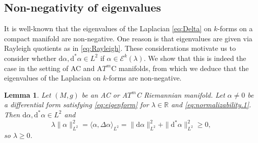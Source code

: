 \documentclass{article}
\newtheorem{lem}[thm]{Lemma}
\theoremstyle{definition}
\numberwithin{thm}{section}
\numberwithin{equation}{section}
\def\R{\mathbb{R}}
\def\d{\mathrm{d}}
\begin{document}
\subsection{Non-negativity of eigenvalues}

It is well-known that the eigenvalues  of the Laplacian \eqref{eq:Delta} on $k$-forms on a compact manifold are non-negative.  One reason is that eigenvalues are given via Rayleigh quotients as in \eqref{eq:Rayleigh}.  These considerations motivate us to  consider whether $\d\alpha,\d^*\alpha\in L^2$ if $\alpha\in\mathcal{E}^k(\lambda)$.   We show that this is indeed the case in the setting of AC and A$T^m$C manifolds, from which we deduce that the eigenvalues of the Laplacian on $k$-forms are non-negative.

\begin{lem}\label{lem:lambda.non.neg} Let $(M,g)$ be an AC or A$T^m$C Riemannian manifold. Let $\alpha\neq 0$ be a differential form satisfying \eqref{eq:eigenform} for $\lambda\in\R$ and \eqref{eq:normalizability.1}.  Then $\d\alpha,\d^*\alpha\in L^2$ and
\begin{equation}\label{eq:lambda.non.neg}
\lambda\|\alpha\|_{L^2}^2=\langle \alpha,\Delta\alpha\rangle_{L^2}=\|\d\alpha\|_{L^2}^2+\|\d^*\alpha\|_{L^2}^2\geq 0,
\end{equation}
so $\lambda\geq 0$.
\end{lem}
\end{document}
